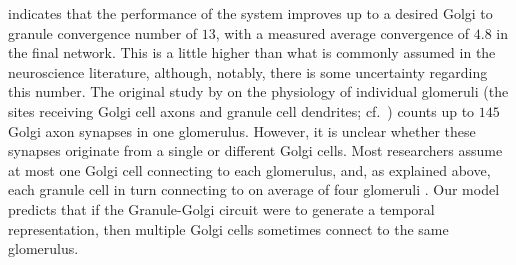  indicates that the performance of the system improves up to a desired Golgi to granule convergence number of $13$, with a measured average convergence of $4.8$ in the final network.
This is a little higher than what is commonly assumed in the neuroscience literature, although, notably, there is some uncertainty regarding this number.
The original study by \citet{jakab1988quantitative} on the physiology of individual glomeruli (the sites receiving Golgi cell axons and granule cell dendrites; cf.~) counts up to $145$ Golgi axon synapses in one glomerulus.
However, it is unclear whether these synapses originate from a single or different Golgi cells.
Most researchers assume at most one Golgi cell connecting to each glomerulus, and, as explained above, each granule cell in turn connecting to on average of four glomeruli \citep{palkovits1972quantitative}.
Our model predicts that if the Granule-Golgi circuit were to generate a temporal representation, then multiple Golgi cells sometimes connect to the same glomerulus.

